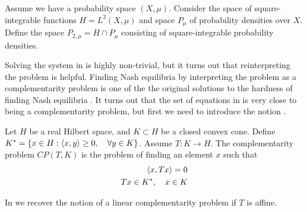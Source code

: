 \begin{definition}
  Assume we have a probability space $(X,\mu)$. Consider the space of square-integrable functions $H=L^2(X,\mu)$ and space $P_{\mu}$ of probability densities over $X$. Define the space $P_{2,\mu}=H \cap P_{\mu}$ consisting of square-integrable probability densities.
\end{definition}
Solving the system in  is highly non-trivial, but it turns out that reinterpreting the problem is helpful.
Finding Nash equilibria by interpreting the problem as a complementarity problem is one of the the original solutions to the hardness of finding Nash equilibria  \citep{karamardian1969nonlinear}. It turns out that the set of equations in  is very close to being a complementarity problem, but first we need to introduce the notion \citep[p. 507]{hadjisavvas2006handbook}.
\begin{definition}
  \label{def:comp_prob}
  Let $H$ be a real Hilbert space, and $K \subset H$ be a closed convex cone. Define $K^* = \{ x \in H : \left \langle x,y \right \rangle \geq 0, \quad \forall y\in K\} $. Assume $T:K \to H$. The complementarity problem $CP(T,K)$ is the problem of finding an element $x$ such that
  \begin{equation}
    \begin{split}
    \left \langle x,Tx \right \rangle = 0 \\
    Tx \in K^*, \quad  x\in K
  \end{split}
  \end{equation}
\end{definition}
In  we recover the notion of a linear complementarity problem if $T$ is affine. %

